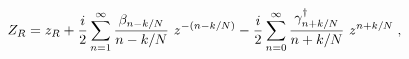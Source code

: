 \begin{equation}
Z_R=z_R + {i\over 2} \sum_{n=1}^\infty {\beta_{n-k/N} \over n-k/N}
~z^{-(n-k/N)}-
{i\over 2} \sum_{n=0}^\infty {\gamma_{n+k/N}^\dagger \over n+k/N}
~z^{n+k/N} \;,
\end{equation}

